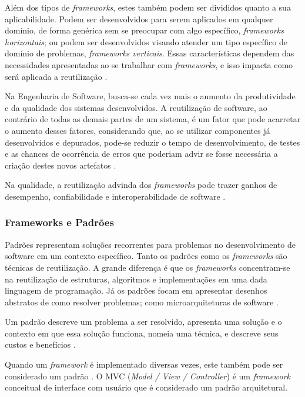 Além dos tipos de \textit{frameworks}, estes também podem ser divididos quanto a sua aplicabilidade. Podem ser desenvolvidos para serem aplicados em qualquer domínio, de forma genérica sem se preocupar com algo específico, \textit{frameworks horizontais}; ou podem ser desenvolvidos visando atender um tipo específico de domínio de problemas, \textit{frameworks verticais}. Essas características dependem das necessidades apresentadas ao se trabalhar com \textit{frameworks}, e isso impacta como será aplicada a reutilização \cite{Kroth:2000}.

Na Engenharia de Software, busca-se cada vez mais o aumento da produtividade e da qualidade dos sistemas desenvolvidos. A reutilização de software, ao contrário de todas as demais partes de um sistema, é um fator que pode acarretar o aumento desses fatores, considerando que, ao se utilizar componentes já desenvolvidos e depurados, pode-se reduzir o tempo de desenvolvimento, de testes e as chances de ocorrência de erros que poderiam advir se fosse necessária a criação destes novos artefatos \cite{Silva:2000}.

Na qualidade, a reutilização advinda dos \textit{frameworks} pode trazer ganhos de desempenho, confiabilidade e interoperabilidade de software \cite{Fayad:Schimidt:1997}.

\subsubsection{Frameworks e Padrões}

Padrões representam soluções recorrentes para problemas no desenvolvimento de software em um contexto específico. Tanto os padrões como os \textit{frameworks} são técnicas de reutilização. A grande diferença é que os \textit{frameworks} concentram-se na reutilização de estruturas, algoritmos e implementações em uma dada linguagem de programação. Já os padrões focam em apresentar desenhos abstratos de como resolver problemas; como microarquiteturas de software \cite{Fayad:Schimidt:1997}.

Um padrão descreve um problema a ser resolvido, apresenta uma solução e o contexto em que essa solução funciona, nomeia uma técnica, e descreve seus custos e benefícios \cite{Johnson:1997}.

Quando um \textit{framework} é implementado diversas vezes, este também pode ser considerado um padrão \cite{Johnson:1997}. O MVC (\textit{Model / View / Controller}) é um \textit{framework} conceitual de interface com usuário que é considerado um padrão arquitetural\cite{Almeida:2006}.

